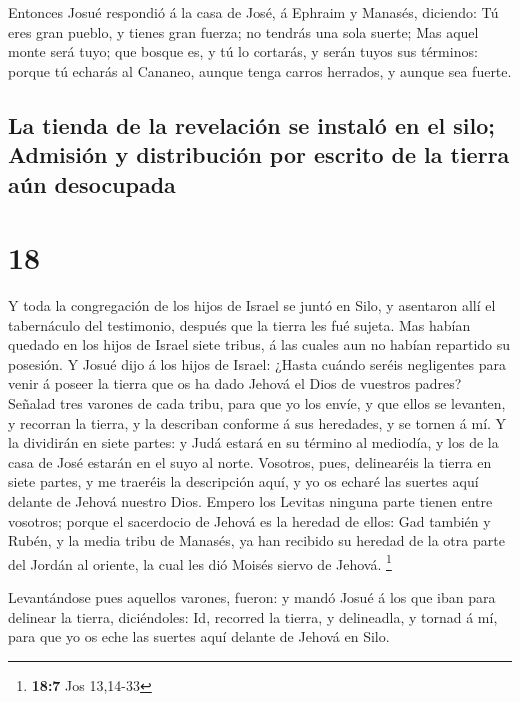  Entonces Josué respondió á la casa de José, á Ephraim y
Manasés, diciendo: Tú eres gran pueblo, y tienes gran fuerza; no tendrás
una sola suerte;  Mas aquel monte será tuyo; que bosque
es, y tú lo cortarás, y serán tuyos sus términos: porque tú echarás al
Cananeo, aunque tenga carros herrados, y aunque sea fuerte.

\hypertarget{la-tienda-de-la-revelaciuxf3n-se-instaluxf3-en-el-silo-admisiuxf3n-y-distribuciuxf3n-por-escrito-de-la-tierra-auxfan-desocupada}{%
\subsection{La tienda de la revelación se instaló en el silo; Admisión y
distribución por escrito de la tierra aún
desocupada}\label{la-tienda-de-la-revelaciuxf3n-se-instaluxf3-en-el-silo-admisiuxf3n-y-distribuciuxf3n-por-escrito-de-la-tierra-auxfan-desocupada}}

\hypertarget{section-17}{%
\section{18}\label{section-17}}

 Y toda la congregación de los hijos de Israel se juntó en
Silo, y asentaron allí el tabernáculo del testimonio, después que la
tierra les fué sujeta.  Mas habían quedado en los hijos de
Israel siete tribus, á las cuales aun no habían repartido su posesión.
 Y Josué dijo á los hijos de Israel: ¿Hasta cuándo seréis
negligentes para venir á poseer la tierra que os ha dado Jehová el Dios
de vuestros padres?  Señalad tres varones de cada tribu,
para que yo los envíe, y que ellos se levanten, y recorran la tierra, y
la describan conforme á sus heredades, y se tornen á mí. 
Y la dividirán en siete partes: y Judá estará en su término al mediodía,
y los de la casa de José estarán en el suyo al norte. 
Vosotros, pues, delinearéis la tierra en siete partes, y me traeréis la
descripción aquí, y yo os echaré las suertes aquí delante de Jehová
nuestro Dios.  Empero los Levitas ninguna parte tienen
entre vosotros; porque el sacerdocio de Jehová es la heredad de ellos:
Gad también y Rubén, y la media tribu de Manasés, ya han recibido su
heredad de la otra parte del Jordán al oriente, la cual les dió Moisés
siervo de Jehová. \footnote{\textbf{18:7} Jos 13,14-33}

 Levantándose pues aquellos varones, fueron: y mandó Josué
á los que iban para delinear la tierra, diciéndoles: Id, recorred la
tierra, y delineadla, y tornad á mí, para que yo os eche las suertes
aquí delante de Jehová en Silo.

